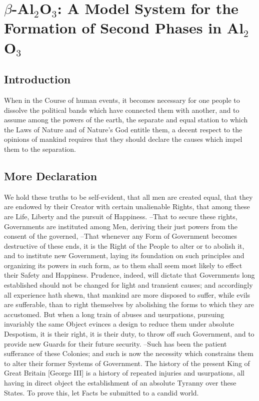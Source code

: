 \chapter{$\beta$-Al$_{2}$O$_{3}$: A Model System for the Formation of Second Phases in Al$_{2}$O$_{3}$}

\section{Introduction}
When in the Course of human events, it becomes necessary for one people  to dissolve the political bands which have connected them with another,  and to assume among the powers of the earth, the separate and equal station  to which the Laws of Nature and of Nature's God entitle them, a decent respect to the opinions of mankind requires that they should declare  the causes which impel them to the separation.

\section{More Declaration}

We hold these truths to be self-evident, that all men are created equal,  that they are endowed by their Creator with certain unalienable Rights,  that among these are Life, Liberty and the pursuit of Happiness. --That to secure these  rights, Governments are instituted among Men, deriving their just powers  from the consent of the governed, --That whenever any Form of Government  becomes destructive of these ends, it is the Right of the People to alter  or to abolish it, and to institute new Government, laying its foundation on  such principles and organizing its powers in such form, as to them shall  seem most likely to effect their Safety and Happiness. Prudence, indeed, will dictate that Governments long established should not  be changed for light and transient causes; and accordingly all experience  hath shewn, that mankind are more disposed to suffer, while evils are  sufferable, than to right themselves by abolishing the forms to which they  are accustomed. But when a long train of abuses and usurpations, pursuing invariably the same  Object evinces a design to reduce them under absolute Despotism, it is their  right, it is their duty, to throw off such Government, and to provide new Guards for their future security. --Such has been the patient sufferance of these Colonies; and such is now the  necessity which constrains them to alter their former Systems of Government.  The history of the present King of Great Britain [George III] is a history  of repeated injuries and usurpations, all having in direct object the  establishment of an absolute Tyranny over these States. To prove this, let Facts be submitted to a candid world.
